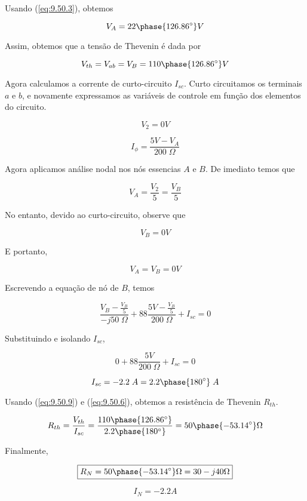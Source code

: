 Usando (\ref{eq:9.50.3}), obtemos

\begin{equation}\label{eq:9.50.5}
    V_{A} = 22\phase{126.86^{\circ}} V
\end{equation}

Assim, obtemos que a tensão de Thevenin é dada por

\begin{equation}\label{eq:9.50.6}
    V_{th} = V_{ab} = V_B = 110\phase{126.86^{\circ}} V
\end{equation}

Agora calculamos a corrente de curto-circuito \( I_{sc}\). 
Curto circuitamos os terminais \( a \) e \( b \), e novamente expressamos as variáveis de controle em função dos elementos
do circuito.

\begin{equation}\label{eq:9.50.7}
    V_{2} = 0 V
\end{equation}

\begin{equation}\label{eq:9.50.8}
    I_{\phi} = \frac{5V - V_A}{200 \;\Omega}
\end{equation}

Agora aplicamos análise nodal nos nós essencias \(A\) e \( B \).
De imediato temos que

\[ V_{A} = \frac{V_2}{5} = \frac{V_B}{5} \]

No entanto, devido ao curto-circuito, observe que 

\[ V_B = 0V \]

E portanto,

\[ V_A = V_B = 0V \]

Escrevendo a equação de nó de \(B\), temos

\[ \frac{V_B - \frac{V_B}{5}}{-j50 \;\Omega} + 88\frac{5V - \frac{V_B}{5}}{200 \;\Omega} + I_{sc} = 0 \]

Substituindo e isolando  \(I_{sc}\),

\[ 0 + 88\frac{5V}{200 \;\Omega} + I_{sc} = 0 \]

\begin{equation}\label{eq:9.50.9}
    I_{sc} = - 2.2 \; A = 2.2\phase{180^{\circ}} \; A
\end{equation}

Usando (\ref{eq:9.50.9}) e (\ref{eq:9.50.6}), obtemos a resistência de Thevenin \( R_{th} \).

\begin{equation}\label{eq:9.50.10}
    R_{th} = \frac{V_{th}}{I_{sc}} = \frac{110\phase{126.86^{\circ}}}{2.2\phase{180^{\circ}}} = 50\phase{-53.14^{\circ}} \Omega
\end{equation}

Finalmente,

\[ \boxed{R_{N} = 50\phase{-53.14^{\circ}} \Omega = 30 - j40 \Omega}  \]

\[ \boxed{I_{N} = - 2.2 A}  \]








